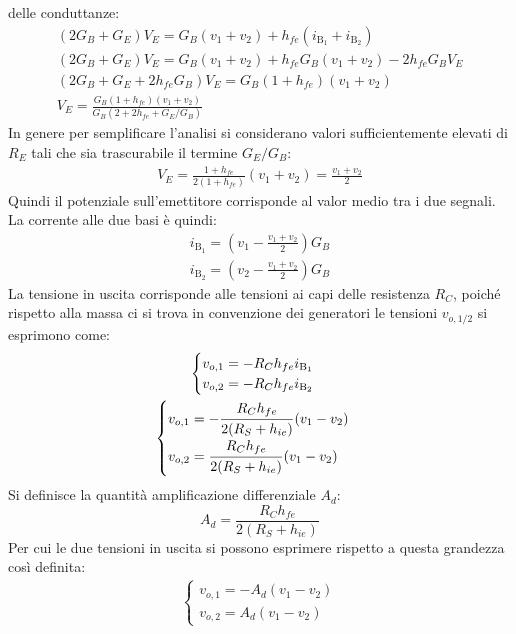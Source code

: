 \documentclass{article}
\numberwithin{equation}{subsection}
\begin{document}
delle conduttanze:
\begin{gather*}
    (2G_B+G_E)V_E=G_B(v_1+v_2)+h_{fe}(i_{\mathrm{B_1}}+i_{\mathrm{B_2}})\\
    (2G_B+G_E)V_E=G_B(v_1+v_2)+h_{fe}G_B(v_1+v_2)-2h_{fe}G_BV_E\\
    (2G_B+G_E+2h_{fe}G_B)V_E=G_B(1+h_{fe})(v_1+v_2)\\
    V_E=\displaystyle\frac{G_B(1+h_{fe})(v_1+v_2)}{G_B(2+2h_{fe}+G_E/G_B)}
\end{gather*}
In genere per semplificare l'analisi si considerano valori sufficientemente elevati di $R_E$ tali che sia trascurabile il termine $G_E/G_B$:
\begin{gather*}
    V_E=\displaystyle\frac{1+h_{fe}}{2(1+h_{fe})}(v_1+v_2)=\frac{v_1+v_2}{2}
\end{gather*}
Quindi il potenziale sull'emettitore corrisponde al valor medio tra i due segnali. La corrente alle due basi è quindi:
\begin{gather*}
    i_{\mathrm{B_1}}=\left(v_1-\displaystyle\frac{v_1+v_2}{2}\right)G_B\\
    i_{\mathrm{B_2}}=\left(v_2-\displaystyle\frac{v_1+v_2}{2}\right)G_B
\end{gather*}
La tensione in uscita corrisponde alle tensioni ai capi delle resistenza $R_C$, poiché rispetto alla massa ci si trova in convenzione dei 
generatori le tensioni $v_{o,1/2}$ si esprimono come:
\begin{gather*}
    \begin{cases}
        v_{o,1}=-R_Ch_{fe}i_{\mathrm{B_1}}\\
        v_{o,2}=-R_Ch_{fe}i_{\mathrm{B_2}}
    \end{cases}\\
        \begin{cases}
        v_{o,1}=\displaystyle-\frac{\strut R_Ch_{fe}}{\strut 2(R_S+h_{ie})}(v_1-v_2)\\
        v_{o,2}=\displaystyle\frac{\strut R_Ch_{fe}}{\strut 2(R_S+h_{ie})}(v_1-v_2)
    \end{cases}
\end{gather*}
Si definisce la quantità amplificazione differenziale $A_d$:
\begin{equation*}
    A_d=\displaystyle\frac{R_Ch_{fe}}{2(R_S+h_{ie})}
\end{equation*}
Per cui le due tensioni in uscita si possono esprimere rispetto a questa grandezza così definita:
\begin{gather*}
    \begin{cases}
        v_{o,1}=-A_d(v_1-v_2)\\
        v_{o,2}=A_d(v_1-v_2)
    \end{cases}
\end{gather*}
\end{document}
